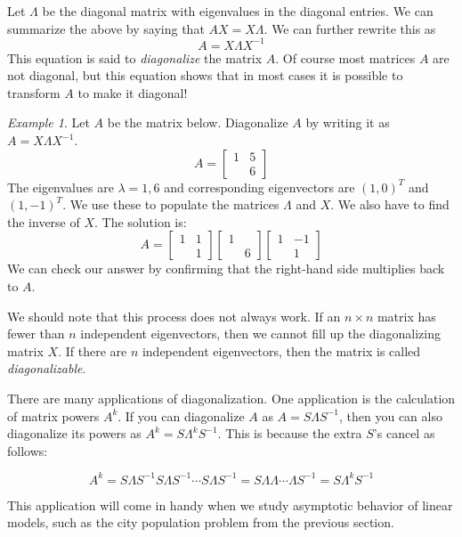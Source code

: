 \documentclass[11pt,oneside]{amsbook}
\theoremstyle{definition}
\theoremstyle{plain}
\theoremstyle{definition}
\theoremstyle{remark}
\newtheorem{example}[theorem]{Example}
\numberwithin{equation}{section}
\numberwithin{figure}{section}
\begin{document}
Let $\Lambda$ be the diagonal matrix with eigenvalues in the diagonal entries. We can summarize the above by saying that $AX=X\Lambda$. We can further rewrite this as
\[A=X\Lambda X^{-1}
\]
This equation is said to \emph{diagonalize} the matrix $A$. Of course most matrices $A$ are not diagonal, but this equation shows that in most cases it is possible to transform $A$ to make it diagonal!

\begin{example}
  Let $A$ be the matrix below. Diagonalize $A$ by writing it as $A=X\Lambda X^{-1}$.
  \[A=\begin{bmatrix}1&5\\&6\end{bmatrix}
  \]
  The eigenvalues are $\lambda=1,6$ and corresponding eigenvectors are $(1,0)^T$ and $(1,-1)^T$. We use these to populate the matrices $\Lambda$ and $X$. We also have to find the inverse of $X$. The solution is:
  \[A=\begin{bmatrix}1&1\\&1\end{bmatrix}
    \begin{bmatrix}1&\\&6\end{bmatrix}
    \begin{bmatrix}1&-1\\&1\end{bmatrix}
  \]
  We can check our answer by confirming that the right-hand side multiplies back to $A$.
\end{example}

We should note that this process does not always work. If an $n\times n$ matrix has fewer than $n$ independent eigenvectors, then we cannot fill up the diagonalizing matrix $X$. If there are $n$ independent eigenvectors, then the matrix is called \emph{diagonalizable}.

There are many applications of diagonalization. One application is the calculation of matrix powers $A^k$. If you can diagonalize $A$ as $A=S\Lambda S^{-1}$, then you can also diagonalize its powers as $A^k=S\Lambda^kS^{-1}$. This is because the extra $S$'s cancel as follows:

\[A^k=S\Lambda S^{-1}S\Lambda S^{-1}\cdots S\Lambda S^{-1}
=S\Lambda\Lambda\cdots\Lambda S^{-1}=S\Lambda^kS^{-1}
\]

This application will come in handy when we study asymptotic behavior of linear models, such as the city population problem from the previous section.
\end{document}
